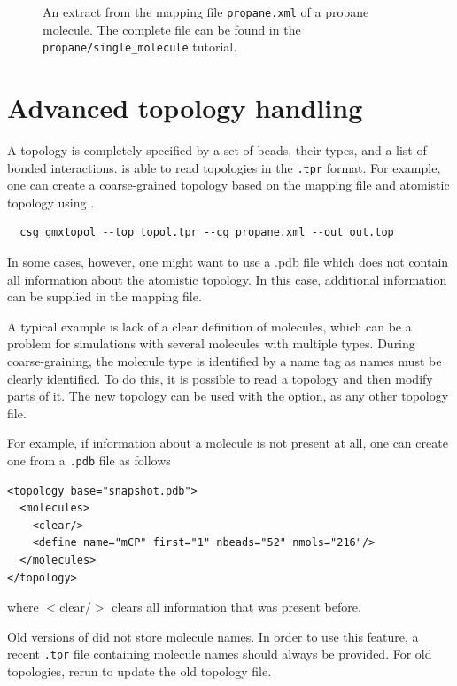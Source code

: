 \begin{figure}
\centering
\framebox{

}
\caption{An extract from the mapping file \texttt{propane.xml} of a propane molecule. The complete file can be found in the \texttt{propane/single\_molecule} tutorial.}
\end{figure}

\section{Advanced topology handling}
\label{sec:adv_topology}
A topology is completely specified by a set of beads, their types, and a list of bonded interactions. \votca is able to read topologies in the \gromacs \texttt{.tpr} format. For example, one can create a coarse-grained topology based on the mapping file and atomistic \gromacs topology using .
\begin{verbatim}
  csg_gmxtopol --top topol.tpr --cg propane.xml --out out.top
\end{verbatim}


In some cases, however, one might want to use a .pdb file which does not contain all information about the atomistic topology. In this case, additional information can be supplied in the \xml mapping file.

A typical example is lack of a clear definition of molecules, which can be a problem for simulations with several molecules with multiple types. During coarse-graining, the molecule type is identified by a name tag as names must be clearly identified. To do this, it is possible to read a topology and then modify parts of it. The new \xml topology can be used with the  option, as any other topology file.

For example, if information about a molecule is not present at all, one can create one from a \texttt{.pdb} file as follows
\begin{lstlisting}
<topology base="snapshot.pdb">
  <molecules>
    <clear/>
    <define name="mCP" first="1" nbeads="52" nmols="216"/>
  </molecules>
</topology>
\end{lstlisting}
where $<$clear/$>$ clears all information that was present before.

Old versions of \gromacs did not store molecule names. In order to use this feature, a recent \texttt{.tpr} file containing molecule names should always be provided. For old topologies, rerun \gromacs {} to update the old topology file.

